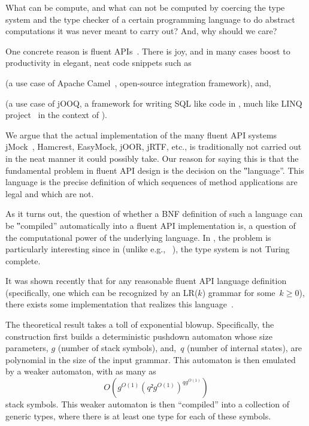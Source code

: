 What can be compute, and what can not be computed by coercing the type system
and the type checker of a certain programming language to do abstract
computations it was never meant to carry out? And, why should we care?

One concrete reason is fluent
APIs~\cite{VanDeursen:Klint:2000,Hudak:1997,Fowler:2010}.  There is joy, and in
many cases boost to productivity in elegant, neat code snippets such as
\begin{quote}
  \label{figure:DSL}
  \parbox[c]{44ex}{}
\end{quote}
(a use case of Apache Camel~\cite{Ibsen:Anstey:10}, open-source integration
framework), and,
\begin{quote}
\end{quote}
(a use case of jOOQ, a framework for writing
SQL like code in \Java, much like LINQ project~\cite{Meijer:Beckman:Bierman:06}
in the context of \CSharp).

We argue that
the actual implementation of the many fluent API systems
jMock~\cite{Freeman:Pryce:06},
Hamcrest,
EasyMock,
jOOR,
jRTF,
etc., is traditionally not carried out
in the neat manner it could possibly take.
Our reason for saying this is that the fundamental problem in
fluent API design is the decision on the ‟language”.
This language is the precise definition of which sequences of method
applications are legal and which are not.

As it turns out, the question of whether a BNF definition of such a language
can be ‟compiled” automatically into a fluent API implementation is, a
question of the computational power of the underlying language. In \Java, the problem
is particularly interesting since in \Java (unlike e.g., \CC~\cite{Gutterman:2003}),
the type system is not Turing complete.

It was shown recently that for any reasonable fluent API language definition
(specifically, one which can be recognized by an LR($k$) grammar for some~$k
≥0$), there exists some \Java implementation that realizes this
language~\cite{Gil:Levy:2016}.

The theoretical result takes a toll of exponential blowup. Specifically, the
construction first builds a deterministic pushdown automaton whose size
parameters, $g$ (number of stack symbols), and,~$q$ (number of internal
states), are polynomial in the size of the input grammar. This automaton is then
emulated by a weaker automaton, with as many as
\[
  O\left(g^{O(1)}\left(q²g^{O(1)}\right)^{qg^{O(1)}}\right)
\] 
stack symbols.
This weaker automaton is then ``compiled'' into a  collection of generic \Java types,
where there is at least one type for each of these symbols.

